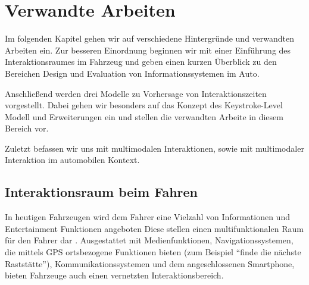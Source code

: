 \chapter{Verwandte Arbeiten}\label{cha:verwandteArbeiten}
Im folgenden Kapitel gehen wir auf verschiedene Hintergründe und verwandten Arbeiten ein. 
Zur besseren Einordnung beginnen wir mit einer Einführung des Interaktionsraumes im Fahrzeug und geben einen kurzen Überblick zu den Bereichen Design und Evaluation von Informationssystemen im Auto.

Anschließend werden drei Modelle zu Vorhersage von Interaktionszeiten vorgestellt. 
Dabei gehen wir besonders auf das Konzept des Keystroke-Level Modell und Erweiterungen ein und stellen die verwandten Arbeite in diesem Bereich vor. 

Zuletzt befassen wir uns mit multimodalen Interaktionen, sowie mit multimodaler Interaktion im automobilen Kontext.   

\section{Interaktionsraum beim Fahren}
In heutigen Fahrzeugen wird dem Fahrer eine Vielzahl von Informationen und Entertainment Funktionen angeboten
Diese stellen einen multifunktionalen Raum für den Fahrer dar \citep{Kern:2009}. 
Ausgestattet mit Medienfunktionen, Navigationssystemen, die mittels GPS ortsbezogene Funktionen bieten (zum Beispiel "`finde die nächste Raststätte"'), Kommunikationssystemen und dem angeschlossenen Smartphone, bieten Fahrzeuge auch einen vernetzten Interaktionsbereich.

